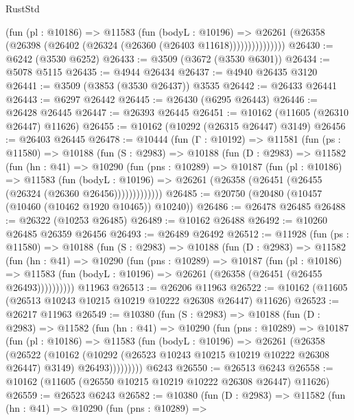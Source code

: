 \begin{lexlean}{RustStd}
\begin{coremodule}
                  (fun (pl : @10186) =>
                  @11583
                    (fun (bodyL : @10196) =>
                    @26261 (@26358 (@26398 (@26402 (@26324 (@26360 (@26403 @11618)))))))))))))))
@26430 := @6242 (@3530 @6252)
@26433 := @3509 (@3672 (@3530 @6301))
@26434 := @5078 @5115
@26435 := @4944 @26434
@26437 := @4940 @26435 @3120
@26441 := @3509 (@3853 (@3530 @26437)) @3535
@26442 := @26433 @26441
@26443 := @6297 @26442
@26445 := @26430 (@6295 @26443)
@26446 := @26428 @26445
@26447 := @26393 @26445
@26451 := @10162 (@11605 (@26310 @26447) @11626)
@26455 := @10162 (@10292 (@26315 @26447) @3149)
@26456 := @26403 @26445
@26478 := @10444
    (fun (Γ : @10192) =>
    @11581
      (fun (ps : @11580) =>
      @10188
        (fun (S : @2983) =>
        @10188
          (fun (D : @2983) =>
          @11582
            (fun (hn : @41) =>
            @10290
              (fun (pns : @10289) =>
              @10187
                (fun (pl : @10186) =>
                @11583
                  (fun (bodyL : @10196) =>
                  @26261 (@26358 (@26451 (@26455 (@26324 (@26360 @26456)))))))))))))
@26485 := @20750 (@20480 (@10457 (@10460 (@10462 @1920 @10465)) @10240))
@26486 := @26478 @26485
@26488 := @26322 (@10253 @26485)
@26489 := @10162 @26488
@26492 := @10260 @26485 @26359 @26456
@26493 := @26489 @26492
@26512 := @11928
    (fun (ps : @11580) =>
    @10188
      (fun (S : @2983) =>
      @10188
        (fun (D : @2983) =>
        @11582
          (fun (hn : @41) =>
          @10290
            (fun (pns : @10289) =>
            @10187
              (fun (pl : @10186) =>
              @11583 (fun (bodyL : @10196) => @26261 (@26358 (@26451 (@26455 @26493))))))))))
    @11963
@26513 := @26206 @11963
@26522 := @10162 (@11605 (@26513 @10243 @10215 @10219 @10222 @26308 @26447) @11626)
@26523 := @26217 @11963
@26549 := @10380
    (fun (S : @2983) =>
    @10188
      (fun (D : @2983) =>
      @11582
        (fun (hn : @41) =>
        @10290
          (fun (pns : @10289) =>
          @10187
            (fun (pl : @10186) =>
            @11583
              (fun (bodyL : @10196) =>
              @26261
                (@26358
                  (@26522
                    (@10162
                      (@10292 (@26523 @10243 @10215 @10219 @10222 @26308 @26447) @3149)
                      @26493)))))))))
    @6243
@26550 := @26513 @6243
@26558 := @10162 (@11605 (@26550 @10215 @10219 @10222 @26308 @26447) @11626)
@26559 := @26523 @6243
@26582 := @10380
    (fun (D : @2983) =>
    @11582
      (fun (hn : @41) =>
      @10290
        (fun (pns : @10289) =>

\end{coremodule}
\end{lexlean}
